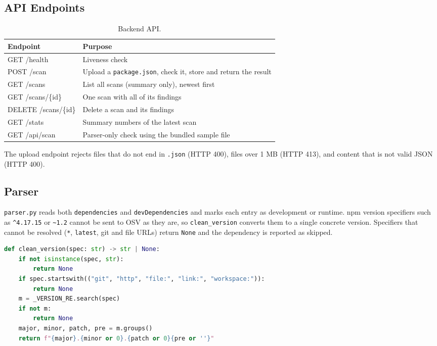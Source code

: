\documentclass[12pt,a4paper]{report}
\begin{document}
\subsection{API Endpoints}
\begin{table}[htbp]
\centering
\begin{tabularx}{\textwidth}{>{\ttfamily}l X}
\toprule
\textbf{Endpoint} & \textbf{Purpose} \\
\midrule
GET /health & Liveness check \\
POST /scan & Upload a \texttt{package.json}, check it, store and return the result \\
GET /scans & List all scans (summary only), newest first \\
GET /scans/\{id\} & One scan with all of its findings \\
DELETE /scans/\{id\} & Delete a scan and its findings \\
GET /stats & Summary numbers of the latest scan \\
GET /api/scan & Parser-only check using the bundled sample file \\
\bottomrule
\end{tabularx}
\caption{Backend API.}
\end{table}

The upload endpoint rejects files that do not end in \texttt{.json} (HTTP 400), files over 1 MB (HTTP 413), and content that is not valid JSON (HTTP 400).

\subsection{Parser}
\texttt{parser.py} reads both \texttt{dependencies} and \texttt{devDependencies} and marks each entry as development or runtime. npm version specifiers such as \verb|^4.17.15| or \verb|~1.2| cannot be sent to OSV as they are, so \texttt{clean\_version} converts them to a single concrete version. Specifiers that cannot be resolved (\texttt{*}, \texttt{latest}, git and file URLs) return \texttt{None} and the dependency is reported as skipped.

\begin{lstlisting}[language=Python, caption={Version cleaning in \texttt{parser.py}.}]
def clean_version(spec: str) -> str | None:
    if not isinstance(spec, str):
        return None
    if spec.startswith(("git", "http", "file:", "link:", "workspace:")):
        return None
    m = _VERSION_RE.search(spec)
    if not m:
        return None
    major, minor, patch, pre = m.groups()
    return f"{major}.{minor or 0}.{patch or 0}{pre or ''}"
\end{lstlisting}
\end{document}
